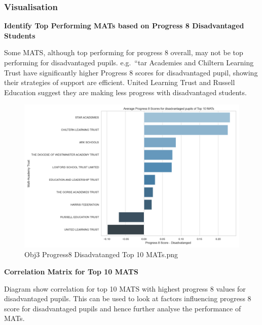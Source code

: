 \documentclass[
  letterpaper,
  DIV=11,
  numbers=noendperiod]{scrartcl}
\begin{document}
\subsubsection{Visualisation}\label{visualisation-1}

\textbf{Identify Top Performing MATs based on Progress 8 Disadvantaged
Students}

Some MATS, although top performing for progress 8 overall, may not be
top performing for disadvantaged pupils. e.g.~``tar Academies and
Chiltern Learning Trust have significantly higher Progress 8 scores for
disadvantaged pupil, showing their strategies of support are efficient.
United Learning Trust and Russell Education suggest they are making less
progress with disadvantaged students.

\begin{figure}[H]

{\centering \includegraphics{images/Obj3_Progress8 disadvatanged top 10 MATs.png}

}

\caption{Obj3 Progress8 Disadvatanged Top 10 MATs.png}

\end{figure}%

\textbf{Correlation Matrix for Top 10 MATS}

Diagram show correlation for top 10 MATS with highest progress 8 values
for disadvantaged pupils. This can be used to look at factors
influencing progress 8 score for disadvantaged pupils and hence further
analyse the performance of MATs.
\end{document}
